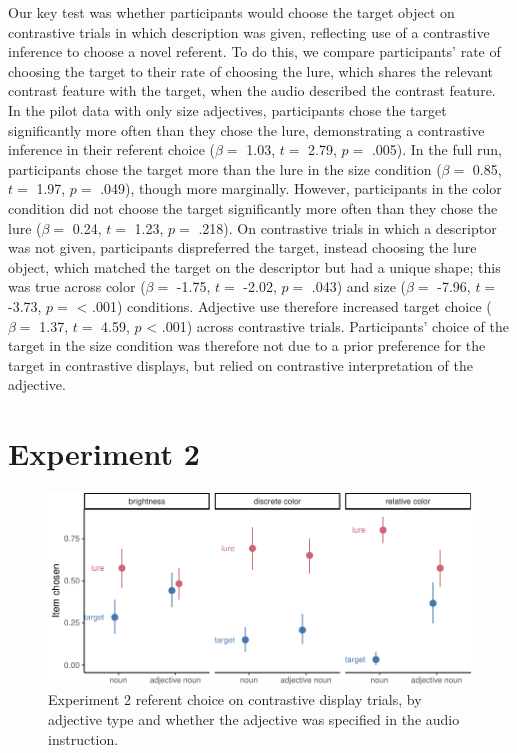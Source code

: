 \documentclass[10pt, letterpaper]{article}
\newenvironment{CodeChunk}{}{}
\begin{document}
Our key test was whether participants would choose the target object on
contrastive trials in which description was given, reflecting use of a
contrastive inference to choose a novel referent. To do this, we compare
participants' rate of choosing the target to their rate of choosing the
lure, which shares the relevant contrast feature with the target, when
the audio described the contrast feature. In the pilot data with only
size adjectives, participants chose the target significantly more often
than they chose the lure, demonstrating a contrastive inference in their
referent choice (\(\beta =\) 1.03, \(t =\) 2.79, \(p =\) .005). In the
full run, participants chose the target more than the lure in the size
condition (\(\beta =\) 0.85, \(t =\) 1.97, \(p =\) .049), though more
marginally. However, participants in the color condition did not choose
the target significantly more often than they chose the lure
(\(\beta =\) 0.24, \(t =\) 1.23, \(p =\) .218). On contrastive trials in
which a descriptor was not given, participants dispreferred the target,
instead choosing the lure object, which matched the target on the
descriptor but had a unique shape; this was true across color
(\(\beta =\) -1.75, \(t =\) -2.02, \(p =\) .043) and size (\(\beta =\)
-7.96, \(t =\) -3.73, \(p =\) \textless{} .001) conditions. Adjective
use therefore increased target choice (\(\beta =\) 1.37, \(t =\) 4.59,
\(p\) \textless{} .001) across contrastive trials. Participants' choice
of the target in the size condition was therefore not due to a prior
preference for the target in contrastive displays, but relied on
contrastive interpretation of the adjective.

\section{Experiment 2}\label{experiment-2}

\begin{CodeChunk}
\begin{figure}[tb]

{\centering \includegraphics{figs/e2_fig-1} 

}

\caption[Experiment 2 referent choice on contrastive display trials, by adjective type and whether the adjective was specified in the audio instruction]{Experiment 2 referent choice on contrastive display trials, by adjective type and whether the adjective was specified in the audio instruction.}\label{fig:e2_fig}
\end{figure}
\end{CodeChunk}
\end{document}
